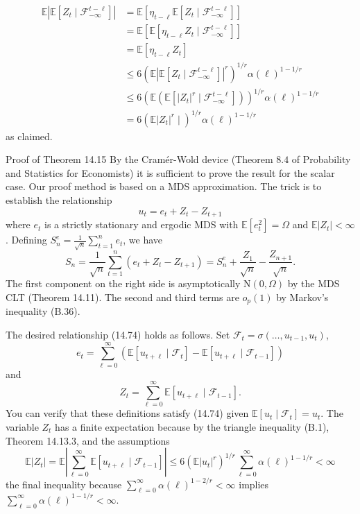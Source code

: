 \documentclass[10pt]{article}
\begin{document}
$$
\begin{aligned}
\mathbb{E}\left|\mathbb{E}\left[Z_{t} \mid \mathscr{F}_{-\infty}^{t-\ell}\right]\right| &=\mathbb{E}\left[\eta_{t-\ell} \mathbb{E}\left[Z_{t} \mid \mathscr{F}_{-\infty}^{t-\ell}\right]\right] \\
&=\mathbb{E}\left[\mathbb{E}\left[\eta_{t-\ell} Z_{t} \mid \mathscr{F}_{-\infty}^{t-\ell}\right]\right] \\
&=\mathbb{E}\left[\eta_{t-\ell} Z_{t}\right] \\
& \leq 6\left(\mathbb{E}\left|\mathbb{E}\left[Z_{t} \mid \mathscr{F}_{-\infty}^{t-\ell}\right]\right|^{r}\right)^{1 / r} \alpha(\ell)^{1-1 / r} \\
& \leq 6\left(\mathbb{E}\left(\mathbb{E}\left[\left|Z_{t}\right|^{r} \mid \mathscr{F}_{-\infty}^{t-\ell}\right]\right)\right)^{1 / r} \alpha(\ell)^{1-1 / r} \\
&=6\left(\mathbb{E}\left|Z_{t}\right|^{r} \mid\right)^{1 / r} \alpha(\ell)^{1-1 / r}
\end{aligned}
$$
as claimed.

Proof of Theorem 14.15 By the Cramér-Wold device (Theorem $8.4$ of Probability and Statistics for Economists) it is sufficient to prove the result for the scalar case. Our proof method is based on a MDS approximation. The trick is to establish the relationship
$$
u_{t}=e_{t}+Z_{t}-Z_{t+1}
$$
where $e_{t}$ is a strictly stationary and ergodic MDS with $\mathbb{E}\left[e_{t}^{2}\right]=\Omega$ and $\mathbb{E}\left|Z_{t}\right|<\infty$. Defining $S_{n}^{e}=\frac{1}{\sqrt{n}} \sum_{t=1}^{n} e_{t}$, we have
$$
S_{n}=\frac{1}{\sqrt{n}} \sum_{t=1}^{n}\left(e_{t}+Z_{t}-Z_{t+1}\right)=S_{n}^{e}+\frac{Z_{1}}{\sqrt{n}}-\frac{Z_{n+1}}{\sqrt{n}} .
$$
The first component on the right side is asymptotically $\mathrm{N}(0, \Omega)$ by the MDS CLT (Theorem 14.11). The second and third terms are $o_{p}(1)$ by Markov's inequality (B.36).

The desired relationship (14.74) holds as follows. Set $\mathscr{F}_{t}=\sigma\left(\ldots, u_{t-1}, u_{t}\right)$,
$$
e_{t}=\sum_{\ell=0}^{\infty}\left(\mathbb{E}\left[u_{t+\ell} \mid \mathscr{F}_{t}\right]-\mathbb{E}\left[u_{t+\ell} \mid \mathscr{F}_{t-1}\right]\right)
$$
and
$$
Z_{t}=\sum_{\ell=0}^{\infty} \mathbb{E}\left[u_{t+\ell} \mid \mathscr{F}_{t-1}\right] .
$$
You can verify that these definitions satisfy (14.74) given $\mathbb{E}\left[u_{t} \mid \mathscr{F}_{t}\right]=u_{t}$. The variable $Z_{t}$ has a finite expectation because by the triangle inequality (B.1), Theorem 14.13.3, and the assumptions
$$
\mathbb{E}\left|Z_{t}\right|=\mathbb{E}\left|\sum_{\ell=0}^{\infty} \mathbb{E}\left[u_{t+\ell} \mid \mathscr{F}_{t-1}\right]\right| \leq 6\left(\mathbb{E}\left|u_{t}\right|^{r}\right)^{1 / r} \sum_{\ell=0}^{\infty} \alpha(\ell)^{1-1 / r}<\infty
$$
the final inequality because $\sum_{\ell=0}^{\infty} \alpha(\ell)^{1-2 / r}<\infty$ implies $\sum_{\ell=0}^{\infty} \alpha(\ell)^{1-1 / r}<\infty$.
\end{document}
